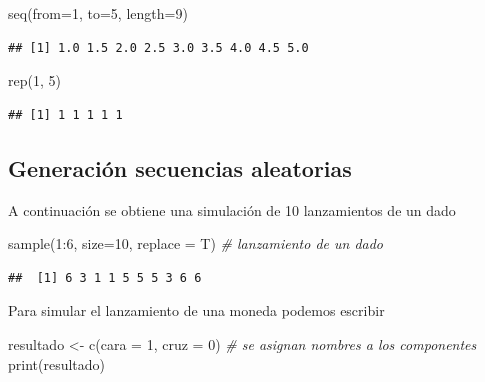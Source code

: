 \documentclass[
]{book}
\newenvironment{Shaded}{\begin{snugshade}}{\end{snugshade}}
\newcommand{\AttributeTok}[1]{\textcolor[rgb]{0.77,0.63,0.00}{#1}}
\newcommand{\CommentTok}[1]{\textcolor[rgb]{0.56,0.35,0.01}{\textit{#1}}}
\newcommand{\DecValTok}[1]{\textcolor[rgb]{0.00,0.00,0.81}{#1}}
\newcommand{\FunctionTok}[1]{\textcolor[rgb]{0.00,0.00,0.00}{#1}}
\newcommand{\NormalTok}[1]{#1}
\newcommand{\OtherTok}[1]{\textcolor[rgb]{0.56,0.35,0.01}{#1}}
\newcommand{\SpecialCharTok}[1]{\textcolor[rgb]{0.00,0.00,0.00}{#1}}
\theoremstyle{break}
\theoremstyle{nonumberplain}
\begin{document}
\begin{Shaded}
\begin{Highlighting}[]
\FunctionTok{seq}\NormalTok{(}\AttributeTok{from=}\DecValTok{1}\NormalTok{, }\AttributeTok{to=}\DecValTok{5}\NormalTok{, }\AttributeTok{length=}\DecValTok{9}\NormalTok{)}
\end{Highlighting}
\end{Shaded}

\begin{verbatim}
## [1] 1.0 1.5 2.0 2.5 3.0 3.5 4.0 4.5 5.0
\end{verbatim}

\begin{Shaded}
\begin{Highlighting}[]
\FunctionTok{rep}\NormalTok{(}\DecValTok{1}\NormalTok{, }\DecValTok{5}\NormalTok{)}
\end{Highlighting}
\end{Shaded}

\begin{verbatim}
## [1] 1 1 1 1 1
\end{verbatim}

\hypertarget{generaciuxf3n-secuencias-aleatorias}{%
\subsection{Generación secuencias aleatorias}\label{generaciuxf3n-secuencias-aleatorias}}

A continuación se obtiene una simulación de 10 lanzamientos de un dado

\begin{Shaded}
\begin{Highlighting}[]
\FunctionTok{sample}\NormalTok{(}\DecValTok{1}\SpecialCharTok{:}\DecValTok{6}\NormalTok{, }\AttributeTok{size=}\DecValTok{10}\NormalTok{, }\AttributeTok{replace =}\NormalTok{ T) }\CommentTok{\# lanzamiento de un dado}
\end{Highlighting}
\end{Shaded}

\begin{verbatim}
##  [1] 6 3 1 1 5 5 5 3 6 6
\end{verbatim}

Para simular el lanzamiento de una moneda podemos escribir

\begin{Shaded}
\begin{Highlighting}[]
\NormalTok{resultado }\OtherTok{\textless{}{-}} \FunctionTok{c}\NormalTok{(}\AttributeTok{cara =} \DecValTok{1}\NormalTok{, }\AttributeTok{cruz =} \DecValTok{0}\NormalTok{) }\CommentTok{\# se asignan nombres a los componentes}
\FunctionTok{print}\NormalTok{(resultado)}
\end{Highlighting}
\end{Shaded}
\end{document}
